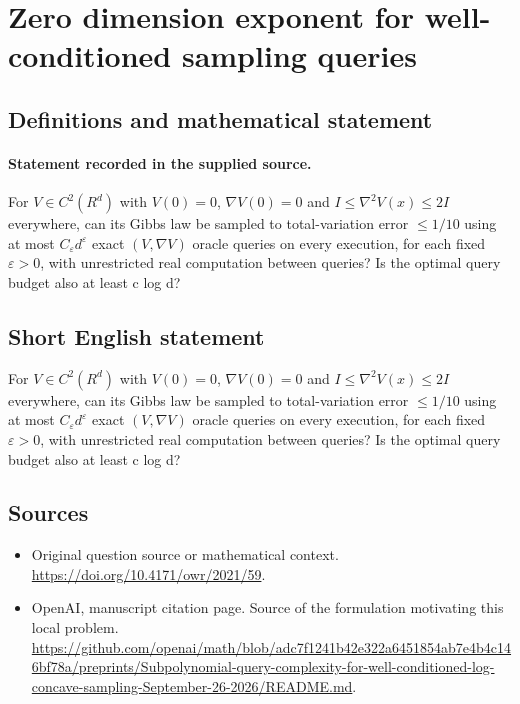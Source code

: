 \documentclass[11pt]{article}
\begin{document}
\section*{Zero dimension exponent for well-conditioned sampling queries}\label{statement}
\subsection{Definitions and mathematical statement}
\paragraph{Statement recorded in the supplied source.}
For $V\in C^{2}(R^d)$ with $V(0)=0$, $\nabla V(0)=0$ and $I\leq \nabla ^{2}V(x)\leq 2I$ everywhere, can its Gibbs law be sampled to total-variation error $\leq 1/10$ using at most $C_\varepsilon d^\varepsilon $ exact $(V,\nabla V)$ oracle queries on every execution, for each fixed $\varepsilon >0$, with unrestricted real computation between queries? Is the optimal query budget also at least c log d?
\subsection{Short English statement}
For $V\in C^{2}(R^d)$ with $V(0)=0$, $\nabla V(0)=0$ and $I\leq \nabla ^{2}V(x)\leq 2I$ everywhere, can its Gibbs law be sampled to total-variation error $\leq 1/10$ using at most $C_\varepsilon d^\varepsilon $ exact $(V,\nabla V)$ oracle queries on every execution, for each fixed $\varepsilon >0$, with unrestricted real computation between queries? Is the optimal query budget also at least c log d?
\subsection{Sources}
\begin{itemize}
\item[S1] Original question source or mathematical context.
\url{https://doi.org/10.4171/owr/2021/59}.
\item[S2] OpenAI, manuscript citation page. Source of the formulation motivating this local problem.
\url{https://github.com/openai/math/blob/adc7f1241b42e322a6451854ab7e4b4c146bf78a/preprints/Subpolynomial-query-complexity-for-well-conditioned-log-concave-sampling-September-26-2026/README.md}.
\end{itemize}
\end{document}
